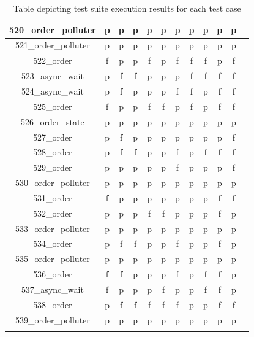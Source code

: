 \documentclass[
fancyheadings, %
%
%
]{stsreprt}
\begin{document}
\begin{longtable}{|c|c|c|c|c|c|c|c|c|c|c|c|}
\hline
520\_order\_polluter & p & p & p & p & p & p & p & p & p & p \\
\hline
521\_order\_polluter & p & p & p & p & p & p & p & p & p & p \\
\hline
522\_order & f & p & p & f & p & f & f & f & p & f \\
\hline
523\_async\_wait & p & f & f & p & p & p & f & f & f & f \\
\hline
524\_async\_wait & p & f & p & p & p & f & f & p & f & f \\
\hline
525\_order & f & p & p & f & f & p & f & p & f & f \\
\hline
526\_order\_state & p & p & p & p & p & p & p & p & p & p \\
\hline
527\_order & p & f & p & p & p & p & p & p & p & f \\
\hline
528\_order & p & f & f & p & p & f & p & f & f & f \\
\hline
529\_order & p & p & p & p & p & f & p & p & p & f \\
\hline
530\_order\_polluter & p & p & p & p & p & p & p & p & p & p \\
\hline
531\_order & f & p & p & p & p & p & p & p & f & f \\
\hline
532\_order & p & p & p & f & f & p & p & p & f & p \\
\hline
533\_order\_polluter & p & p & p & p & p & p & p & p & p & p \\
\hline
534\_order & p & f & f & p & p & f & p & p & f & p \\
\hline
535\_order\_polluter & p & p & p & p & p & p & p & p & p & p \\
\hline
536\_order & f & f & p & p & p & f & p & f & f & p \\
\hline
537\_async\_wait & f & p & p & p & f & p & p & f & f & p \\
\hline
538\_order & p & f & f & f & f & f & p & p & f & f \\
\hline
539\_order\_polluter & p & p & p & p & p & p & p & p & p & p \\
\hline
\caption{Table depicting test suite execution results for each test case}
\label{table:exec-res}
\end{longtable}

\backmatter


\end{document}
